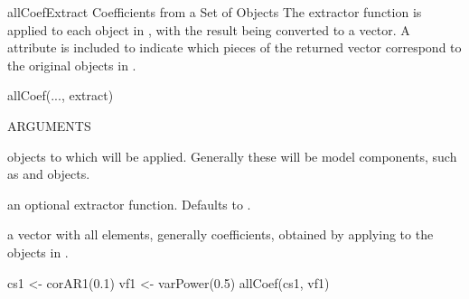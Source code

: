 \documentclass[pdftex]{article} \usepackage{url,graphicx}
\begin{document}
\begin{Helpfile}{allCoef}{Extract Coefficients from a Set of Objects}
The extractor function is applied to each object in , with
the result being converted to a vector. A  attribute is
included to indicate which pieces of the returned vector correspond to
the original objects in .
\begin{Example}
allCoef(..., extract)
\end{Example}
\begin{Argument}{ARGUMENTS}
\item[\Co{...:}]
objects to which  will be applied. Generally
these will be model components, such as  and
 objects.
\item[\Co{extract:}]
an optional extractor function. Defaults to .
\end{Argument}
a vector with all elements, generally coefficients, obtained by
applying  to the objects in .
\need 15pt
\vspace{-16pt} 
\begin{Example}
cs1 <- corAR1(0.1)
vf1 <- varPower(0.5)
allCoef(cs1, vf1)
\end{Example}
\end{Helpfile}
\end{document}
